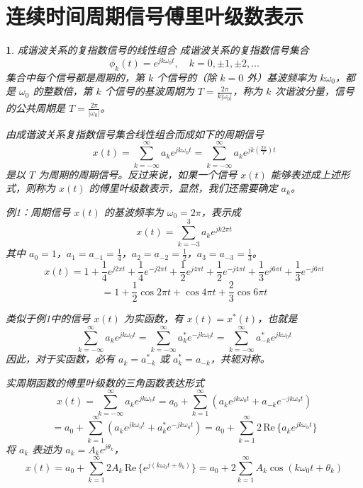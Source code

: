 \documentclass[UTF8]{report}
\def\Re{\mathrm{\,Re\,}}
\theoremstyle{MyLineTheoremStyle} %
\theoremstyle{MyBlockTheoremStyle} %
\theoremstyle{MySubsubsectionStyle} %
\newtheorem{definition}{}
\begin{document}
\section{连续时间周期信号傅里叶级数表示}

\begin{definition}
    成谐波关系的复指数信号的线性组合
    成谐波关系的复指数信号集合
    \[
    \phi_k(t) = e^{jk\omega_0 t}, \quad k = 0, \pm1, \pm2, \ldots
    \]
    集合中每个信号都是周期的，第 $k$ 个信号的（除 $k = 0$ 外）基波频率为 $k\omega_0$，都是 $\omega_0$ 的整数倍，第 $k$ 个信号的基波周期为 $T = \frac{2\pi}{k|\omega_0|}$，称为 $k$ 次谐波分量，信号的公共周期是 $T = \frac{2\pi}{|\omega_0|}$。

    由成谐波关系复指数信号集合线性组合而成如下的周期信号
    \[
    x(t) = \sum_{k=-\infty}^{\infty} a_k e^{jk\omega_0 t} = \sum_{k=-\infty}^{\infty} a_k e^{jk\left(\frac{2\pi}{T}\right)t}
    \]
    是以 $T$ 为周期的周期信号。反过来说，如果一个信号 $x(t)$ 能够表述成上述形式，则称为 $x(t)$ 的傅里叶级数表示，显然，我们还需要确定 $a_k$。

    例1：周期信号 $x(t)$ 的基波频率为 $\omega_0 = 2\pi$，表示成
    \[
    x(t) = \sum_{k=-3}^{3} a_k e^{jk2\pi t}
    \]
    其中 $a_0 = 1$，$a_1 = a_{-1} = \frac{1}{4}$，$a_2 = a_{-2} = \frac{1}{2}$，$a_3 = a_{-3} = \frac{1}{3}$。
    \[
    x(t) = 1 + \frac{1}{4} e^{j2\pi t} + \frac{1}{4} e^{-j2\pi t} + \frac{1}{2} e^{j4\pi t} + \frac{1}{2} e^{-j4\pi t} + \frac{1}{3} e^{j6\pi t} + \frac{1}{3} e^{-j6\pi t}
    \]
    \[
    = 1 + \frac{1}{2} \cos 2\pi t + \cos 4\pi t + \frac{2}{3} \cos 6\pi t
    \]

    类似于例1中的信号 $x(t)$ 为实函数，有 $x(t) = x^*(t)$，也就是
    \[
    \sum_{k=-\infty}^{\infty} a_k e^{jk\omega_0 t} = \sum_{k=-\infty}^{\infty} a_k^* e^{-jk\omega_0 t} = \sum_{k=-\infty}^{\infty} a_{-k}^* e^{jk\omega_0 t}
    \]
    因此，对于实函数，必有 $a_k = a_{-k}^*$ 或 $a_k^* = a_{-k}$，共轭对称。

    实周期函数的傅里叶级数的三角函数表达形式
    \[
    x(t) = \sum_{k=-\infty}^{\infty} a_k e^{jk\omega_0 t} = a_0 + \sum_{k=1}^{\infty} (a_k e^{jk\omega_0 t} + a_{-k} e^{-jk\omega_0 t})
    \]
    \[
    = a_0 + \sum_{k=1}^{\infty} (a_k e^{jk\omega_0 t} + a_k^* e^{-jk\omega_0 t}) = a_0 + \sum_{k=1}^{\infty} 2\Re\{a_k e^{jk\omega_0 t}\}
    \]
    将 $a_k$ 表述为 $a_k = A_k e^{j\theta_k}$，
    \[
    x(t) = a_0 + \sum_{k=1}^{\infty} 2A_k \Re\{e^{j(k\omega_0 t + \theta_k)}\} = a_0 + 2 \sum_{k=1}^{\infty} A_k \cos(k\omega_0 t + \theta_k)
    \]


\end{definition}
\end{document}
